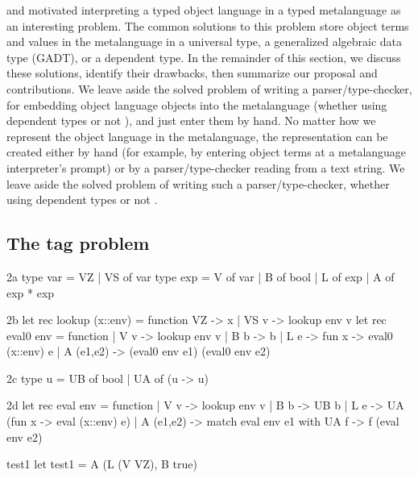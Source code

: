  and \citet{xi-guarded} motivated interpreting
a typed object language in a typed metalanguage as an interesting
problem.  The common solutions to this problem store object terms and
values in the metalanguage in a universal type, a generalized algebraic
data type (GADT), or a dependent type.  In the remainder of this section,
we discuss these solutions, identify their drawbacks, then summarize our
proposal and contributions.  
\ifshort
We leave aside the solved problem of writing a parser\slash type\hyp checker,
for embedding object language objects into the metalanguage
(whether using dependent types \citep{WalidICFP02} or not \citep{baars-typing}),
and just enter them by hand.
\else
No matter how we represent the object language in the
metalanguage, the representation can be created either by hand (for example, by
entering object terms at a metalanguage interpreter's prompt) or
by a parser\slash type\hyp checker reading from a text string.
We leave aside the solved problem of writing such a 
parser\slash type\hyp checker,
whether using dependent types \citep{WalidICFP02} or not \citep{baars-typing}.
\fi

\subsection{The tag problem}\label{tagproblem}

\begin{SaveVerbatim}{2a}
type var = VZ | VS of var
type exp = V of var | B of bool | L of exp | A of exp * exp
\end{SaveVerbatim}
\begin{SaveVerbatim}[commandchars=\@\{\}]{2b}
let rec lookup (x::env) = function VZ -> x | VS v -> lookup env v
let rec eval0 env = function
| V v       -> lookup env v
| B b       -> b 
| L e       -> fun x -> eval0 (x::env) e
| A (e1,e2) -> (eval0 env e1) (eval0 env e2) 
\end{SaveVerbatim}
\begin{SaveVerbatim}{2c}
type u = UB of bool | UA of (u -> u)
\end{SaveVerbatim}
\begin{SaveVerbatim}{2d}
let rec eval env = function
| V v       -> lookup env v
| B b       -> UB b
| L e       -> UA (fun x -> eval (x::env) e)
| A (e1,e2) -> match eval env e1 with UA f -> f (eval env e2)
\end{SaveVerbatim}
\begin{SaveVerbatim}{test1}
let test1 = A (L (V VZ), B true)
\end{SaveVerbatim}

